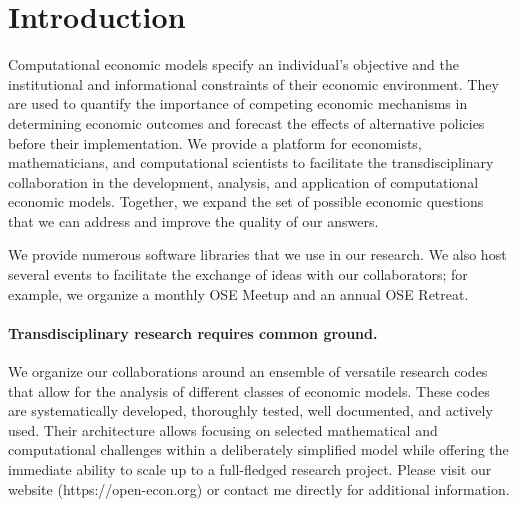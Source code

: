\section{Introduction}


Computational economic models specify an individual’s objective and the institutional and informational constraints of their economic environment. They are used to quantify the importance of competing economic mechanisms in determining economic outcomes and forecast the effects of alternative policies before their implementation. We provide a platform for economists, mathematicians, and computational scientists to facilitate the transdisciplinary collaboration in the development, analysis, and application of computational economic models. Together, we expand the set of possible economic questions that we can address and improve the quality of our answers.

We provide numerous software libraries that we use in our research. We also host several events to facilitate the exchange of ideas with our collaborators; for example, we organize a monthly OSE Meetup and an annual OSE Retreat.

\paragraph{Transdisciplinary research requires common ground.} We organize our collaborations around an ensemble of versatile research codes that allow for the analysis of different classes of economic models. These codes are systematically developed, thoroughly tested, well documented, and actively used. Their architecture allows focusing on selected mathematical and computational challenges within a deliberately simplified model while offering the immediate ability to scale up to a full-fledged research project. Please visit our website (https://open-econ.org) or contact me directly for additional information.

